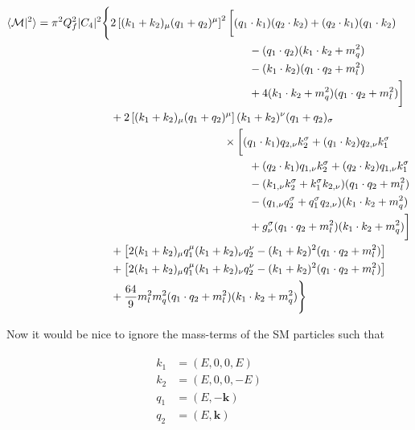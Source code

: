 \documentclass[11pt,a4paper]{article}
\begin{document}
\begin{align}
	\begin{split}
	\langle\mathcal{M}|^2\rangle = \pi^2Q_f^2|C_4|^2\Bigg\{ &2\left[(k_1+k_2)_\mu(q_1+q_2)^\mu\right]^2\bigg[ (q_1\cdot k_1)(q_2\cdot k_2) +(q_2\cdot k_1)(q_1\cdot k_2)\\
	&\hspace{4.4cm}- (q_1\cdot q_2)(k_1\cdot k_2 + m_q^2) \\
	&\hspace{4.4cm}- (k_1\cdot k_2)(q_1\cdot q_2 + m_l^2)\\
	&\hspace{4.4cm} + 4(k_1\cdot k_2 + m_q^2)(q_1\cdot q_2 + m_l^2)\bigg]\\
	&+ 2\left[(k_1+k_2)_\mu(q_1+q_2)^\mu\right](k_1+k_2)^\nu(q_1+q_2)_\sigma\\
	&\hspace{3.6cm}\times\bigg[ (q_1\cdot k_1)q_{2,\nu}k_2^\sigma + (q_1\cdot k_2)q_{2,\nu}k_1^\sigma\\
	&\hspace{4.4cm}+(q_2\cdot k_1)q_{1,\nu}k_2^\sigma + (q_2\cdot k_2)q_{1,\nu}k_1^\sigma\\
	&\hspace{4.4cm} -(k_{1,\nu}k_2^\sigma + k_1^\sigma k_{2,\nu})(q_1\cdot q_2 + m_l^2)\\
	&\hspace{4.4cm} -(q_{1,\nu}q_2^\sigma + q_1^\sigma q_{2,\nu})(k_1\cdot k_2 + m_q^2)\\
	&\hspace{4.4cm} +g_\nu^\sigma(q_1\cdot q_2 + m_l^2)(k_1\cdot k_2 + m_q^2) \bigg]\\
	&+\left[2(k_1+k_2)_\mu q_1^\mu (k_1+k_2)_\nu q_2^\nu - (k_1+k_2)^2(q_1\cdot q_2 + m_l^2)\right]\\
	&+\left[2(k_1+k_2)_\mu q_1^\mu (k_1+k_2)_\nu q_2^\nu - (k_1+k_2)^2(q_1\cdot q_2 + m_l^2)\right]\\
	&+\frac{64}{9}m_l^2m_q^2(q_1\cdot q_2 + m_l^2)(k_1\cdot k_2 + m_q^2)\Bigg\}
	\end{split}
	\label{eq_ffs}
\end{align}

Now it would be nice to ignore the mass-terms of the SM particles such that

\begin{align}
	\begin{split}
	k_1 &= (E,0,0,E)\\
	k_2 &= (E,0,0,-E)\\
	q_1 &= (E,-\bm{k})\\
	q_2 &= (E,\bm{k})
	\end{split}
\end{align}
\end{document}
